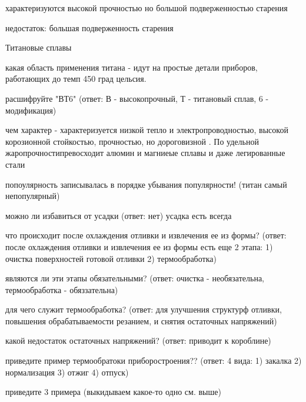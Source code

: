 {\begin{center}
    \par характеризуются высокой прочностью но большой подверженностью старения

    \par недостаток: большая подверженность старения 

    \par Титановые сплавы

    \par какая область применения титана - идут на простые детали приборов, работающих до темп 450 град цельсия. 

    \par расшифруйте "ВТ6" (ответ: В - высокопрочный, Т - титановый сплав, 6 - модификация)

    \par чем характер - характеризуется низкой тепло и электропроводностью, высокой корозионной стойкостью, прочностью, но дороговизной . По удельной жаропрочностипревосходит алюмин и магниеые сплавы и даже легированные стали

    \par попоулярность записывалась в порядке убывания популярности! (титан самый непопулярный)

    \par можно ли избавиться от усадки (ответ: нет) усадка есть всегда

    \par что происходит после охлаждения отливки и извлечения ее из формы? (ответ: после охлаждения отливки и извлечения ее из формы есть еще 2 этапа: 1) очистка поверхностей готовой отливки 2) термообработка) 

    \par являются ли эти этапы обязательными? (ответ: очистка - необязательна, термообработка - обяззательна)

    \par для чего служит термообработка? (ответ: для улучшения структурф отливки, повышения обрабатываемости резанием, и снятия остаточных напряжений)

    \par какой недостаток остаточных напряжений? (ответ: приводит к короблине)

    \par приведите пример термообратоки приборостроения?? (ответ: 4 вида: 1) закалка  2) нормализация 3) отжиг 4) отпуск)

    \par приведите 3 примера (выкидываем какое-то одно см. выше)
    

\end{center}}
